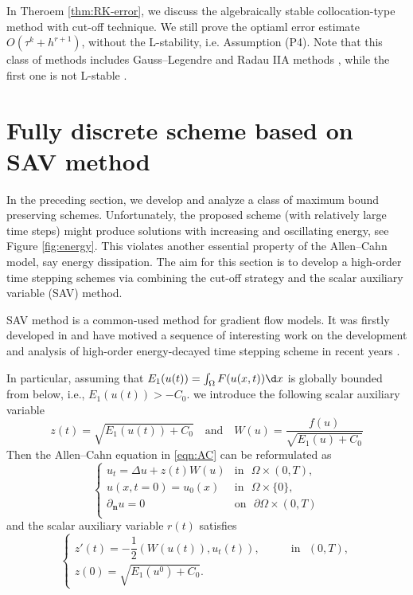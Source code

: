\begin{remark}\label{rem:RK}
In Theroem \ref{thm:RK-error}, we discuss the algebraically stable collocation-type method with cut-off technique.
We still prove the optiaml error estimate $O(\tau^k + h^{r+1})$, without the L-stability, i.e. Assumption (P4).
Note that this class of methods includes Gauss--Legendre and Radau IIA methods \cite[Theorem 12.9]{HairerWanner:2010},
while the first one is not L-stable \cite[Table 5.13]{HairerWanner:2010}.
\end{remark}




\section{Fully discrete scheme based on SAV method}\label{sec:sav}
In the preceding section, we develop and analyze a class of maximum bound preserving schemes.
Unfortunately,  the proposed scheme (with relatively large time steps) might produce solutions
with increasing and oscillating energy, see Figure \ref{fig:energy}.
This violates another essential property of the Allen--Cahn model, say energy dissipation.
The aim for this section is to develop
a high-order time stepping schemes via combining the cut-off strategy and
the scalar auxiliary variable (SAV) method.

SAV method is a common-used method for  gradient flow models. It was firstly developed in
\cite{shen2018scalar,shen2019new} and have motived a sequence of interesting work on the
development and analysis of high-order energy-decayed time stepping scheme
in recent years \cite{akrivis2019energy,ShenXu:2018,Gong:2020}.

In particular, assuming that $E_1(u(t)) = \int_{\Omega}F(u(x,t))\d x$  is globally bounded from below,
i.e., $E_1(u(t)) > -C_0$.
we introduce the following scalar auxiliary variable \cite{shen2018scalar}
\begin{equation}\label{eq:scalar}
 z(t) = \sqrt{E_1(u(t)) + C_0}\quad \text{and} \quad W(u) = \dfrac{f(u)}{\sqrt{E_1(u) + C_0}}
\end{equation}
Then the Allen--Cahn equation in \eqref{eqn:AC} can be reformulated as
\begin{equation}\label{eqn:AC-sav}
    \begin{cases}
    u_t = \Delta u + z(t) W(u) &
        \mbox{in~~} \Omega\times(0,T),\\
    u(x,t=0) = u_0(x)   &
        \mbox{in~~} \Omega\times\{0\},\\
    \partial_{\mathbf{n}}u = 0  &
        \mbox{on~~} \partial\Omega\times(0,T)\\
  \end{cases}
\end{equation}
and the scalar auxiliary variable $r(t)$ satisfies
\begin{equation}\label{eqn:r}
\begin{cases}
    z'(t) = -\dfrac12(W(u(t)), u_t(t)),&\qquad \mbox{in~~} (0,T),\\
   z(0) = \sqrt{E_1(u^0) + C_0}.&
 \end{cases}
\end{equation}

